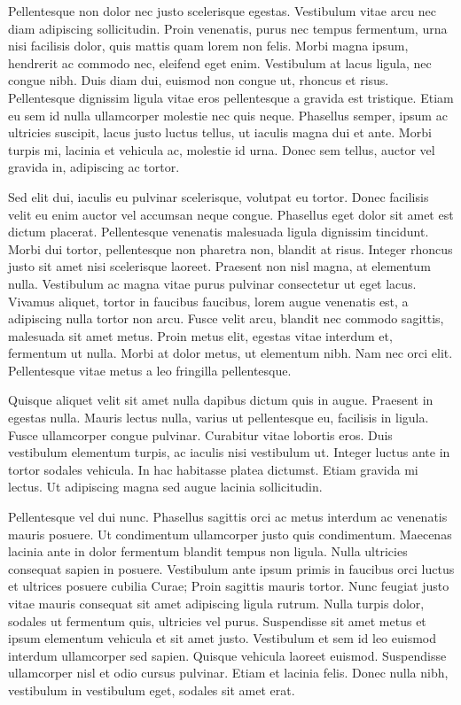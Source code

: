 \documentclass{ritsi/article}
\begin{document}
Pellentesque non dolor nec justo scelerisque egestas. Vestibulum vitae arcu nec diam adipiscing sollicitudin. Proin venenatis, purus nec tempus fermentum, urna nisi facilisis dolor, quis mattis quam lorem non felis. Morbi magna ipsum, hendrerit ac commodo nec, eleifend eget enim. Vestibulum at lacus ligula, nec congue nibh. Duis diam dui, euismod non congue ut, rhoncus et risus. Pellentesque dignissim ligula vitae eros pellentesque a gravida est tristique. Etiam eu sem id nulla ullamcorper molestie nec quis neque. Phasellus semper, ipsum ac ultricies suscipit, lacus justo luctus tellus, ut iaculis magna dui et ante. Morbi turpis mi, lacinia et vehicula ac, molestie id urna. Donec sem tellus, auctor vel gravida in, adipiscing ac tortor.

Sed elit dui, iaculis eu pulvinar scelerisque, volutpat eu tortor. Donec facilisis velit eu enim auctor vel accumsan neque congue. Phasellus eget dolor sit amet est dictum placerat. Pellentesque venenatis malesuada ligula dignissim tincidunt. Morbi dui tortor, pellentesque non pharetra non, blandit at risus. Integer rhoncus justo sit amet nisi scelerisque laoreet. Praesent non nisl magna, at elementum nulla. Vestibulum ac magna vitae purus pulvinar consectetur ut eget lacus. Vivamus aliquet, tortor in faucibus faucibus, lorem augue venenatis est, a adipiscing nulla tortor non arcu. Fusce velit arcu, blandit nec commodo sagittis, malesuada sit amet metus. Proin metus elit, egestas vitae interdum et, fermentum ut nulla. Morbi at dolor metus, ut elementum nibh. Nam nec orci elit. Pellentesque vitae metus a leo fringilla pellentesque.

Quisque aliquet velit sit amet nulla dapibus dictum quis in augue. Praesent in egestas nulla. Mauris lectus nulla, varius ut pellentesque eu, facilisis in ligula. Fusce ullamcorper congue pulvinar. Curabitur vitae lobortis eros. Duis vestibulum elementum turpis, ac iaculis nisi vestibulum ut. Integer luctus ante in tortor sodales vehicula. In hac habitasse platea dictumst. Etiam gravida mi lectus. Ut adipiscing magna sed augue lacinia sollicitudin.

Pellentesque vel dui nunc. Phasellus sagittis orci ac metus interdum ac venenatis mauris posuere. Ut condimentum ullamcorper justo quis condimentum. Maecenas lacinia ante in dolor fermentum blandit tempus non ligula. Nulla ultricies consequat sapien in posuere. Vestibulum ante ipsum primis in faucibus orci luctus et ultrices posuere cubilia Curae; Proin sagittis mauris tortor. Nunc feugiat justo vitae mauris consequat sit amet adipiscing ligula rutrum. Nulla turpis dolor, sodales ut fermentum quis, ultricies vel purus. Suspendisse sit amet metus et ipsum elementum vehicula et sit amet justo. Vestibulum et sem id leo euismod interdum ullamcorper sed sapien. Quisque vehicula laoreet euismod. Suspendisse ullamcorper nisl et odio cursus pulvinar. Etiam et lacinia felis. Donec nulla nibh, vestibulum in vestibulum eget, sodales sit amet erat.
\end{document}

